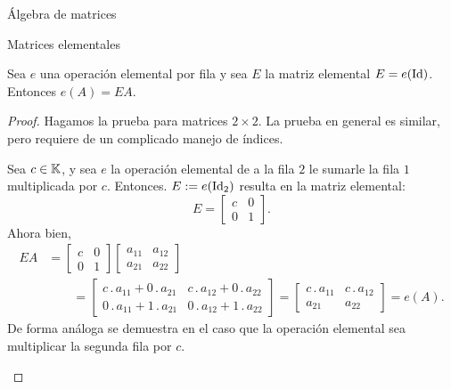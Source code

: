 \begin{chapter}{\'Algebra de matrices}
\begin{section}{Matrices elementales}
            \begin{teorema}\label{th-mrtx-elem}
                Sea $e$ una operación elemental por fila y sea $E$ la matriz elemental $E=e(\operatorname{Id})$. Entonces $e(A) = EA$.
            \end{teorema}
            \begin{proof}
                Hagamos la prueba para matrices $2 \times 2$. La prueba en general es similar, pero requiere de un complicado manejo de índices.
                \begin{enumelem}
                    \item Sea  $c \in \mathbb K$, y  sea $e$ la operación elemental de a la fila $2$ le sumarle  la fila $1$ multiplicada por $c$. Entonces. $E:=e(\operatorname{Id}_2)$ resulta en la matriz elemental:
                    \begin{equation*}
                    E= \begin{bmatrix} c& 0\\ 0&1\end{bmatrix}.
                    \end{equation*}
                    Ahora bien,
                    \begin{align*}
                    E A&=\begin{bmatrix} c& 0\\ 0&1\end{bmatrix}
                    \begin{bmatrix} a_{11}&a_{12}\\a_{21}&a_{22}\end{bmatrix} \\
                    &\qquad= 
                    \begin{bmatrix} 
                    c\,.\,a_{11} + 0 \,.\,a_{21}&c\,.\,a_{12}+0\,.\,a_{22}\\
                    0\,.\,a_{11} + 1 \,.\,a_{21}&0\,.\,a_{12}+1\,.\,a_{22}\end{bmatrix} 
                    =
                    \begin{bmatrix} 
                    c\,.\,a_{11}&c\,.\,a_{12}\\
                    a_{21}&a_{22}\end{bmatrix} = e(A).
                    \end{align*}
                    De forma análoga se demuestra en el caso que la operación elemental sea  multiplicar la segunda fila por $c$.
                    

\end{enumelem}
\end{proof}
\end{section}
\end{chapter}
